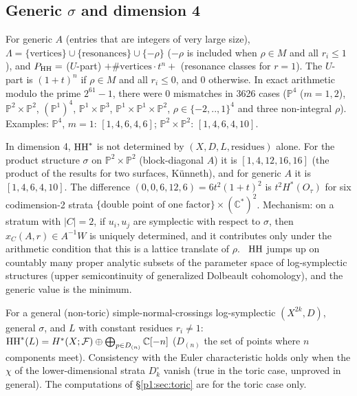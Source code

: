 \subsection{Generic $\sigma$ and dimension 4}
\begin{obs}[\tV]
For generic $A$ (entries that are integers of very large size), $\Lambda=\{\text{vertices}\}\cup\{\text{resonances}\}\cup\{-\rho\}$ ($-\rho$ is included when $\rho\in M$ and all $r_i\le1$), and $P_{\mathrm{HH}}=$ ($U$-part) $+\#\text{vertices}\cdot t^n+$ (resonance classes for $r=1$). The $U$-part is $(1+t)^n$ if $\rho\in M$ and all $r_i\le0$, and $0$ otherwise. In exact arithmetic modulo the prime $2^{61}-1$, there were 0 mismatches in 3626 cases ($\mathbb P^4$ ($m=1,2$), $\mathbb P^2\times\mathbb P^2$, $(\mathbb P^1)^4$, $\mathbb P^1\times\mathbb P^3$, $\mathbb P^1\times\mathbb P^1\times\mathbb P^2$, $\rho\in\{-2,..,1\}^4$ and three non-integral $\rho$). Examples: $\mathbb P^4$, $m=1$: $[1,4,6,4,6]$; $\mathbb P^2\times\mathbb P^2$: $[1,4,6,4,10]$.
\end{obs}
\begin{obs}\label{p1:obs:arith}
In dimension 4, $\mathrm{HH}^*$ is not determined by $(X,D,L,\text{residues})$ alone. For the product structure $\sigma$ on $\mathbb P^2\times\mathbb P^2$ (block-diagonal $A$) it is $[1,4,12,16,16]$ (the product of the results for two surfaces, K\"unneth), and for generic $A$ it is $[1,4,6,4,10]$. The difference $(0,0,6,12,6)=6t^2(1+t)^2$ is $t^2H^*(O_\tau)$ for six codimension-2 strata $\{\text{double point of one factor}\}\times(\mathbb C^*)^2$. Mechanism: on a stratum with $|C|=2$, if $u_i,u_j$ are symplectic with respect to $\sigma$, then $x_C(A,r)\in A^{-1}W$ is uniquely determined, and it contributes only under the arithmetic condition that this is a lattice translate of $\rho$. \tK\ $\mathrm{HH}$ jumps up on countably many proper analytic subsets of the parameter space of log-symplectic structures (upper semicontinuity of generalized Dolbeault cohomology), and the generic value is the minimum.
\end{obs}
\begin{conj}\tK
For a general (non-toric) simple-normal-crossings log-symplectic $(X^{2k},D)$, general $\sigma$, and $L$ with constant residues $r_i\ne1$: $\mathrm{HH}^*(L)=H^*(X;\mathcal F)\oplus\bigoplus_{p\in D_{(n)}}\mathbb C[-n]$ ($D_{(n)}$ the set of points where $n$ components meet). Consistency with the Euler characteristic holds only when the $\chi$ of the lower-dimensional strata $D_k^\circ$ vanish (true in the toric case, unproved in general). The computations of \S\ref{p1:sec:toric} are for the toric case only.
\end{conj}

